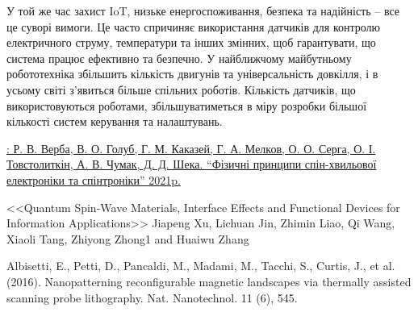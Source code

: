 \documentclass[a4paper,14pt]{extreport}
\begin{document}
У той же час захист IoT, низьке енергоспоживання, безпека та надійність – все це суворі вимоги. Це часто спричиняє використання датчиків для контролю електричного струму, температури та інших змінних, щоб гарантувати, що система працює ефективно та безпечно. У найближчому майбутньому робототехніка збільшить кількість двигунів та універсальність довкілля, і в усьому світі з'явиться більше спільних роботів. Кількість датчиків, що використовуються роботами, збільшуватиметься в міру розробки більшої кількості систем керування та налаштувань.

























\begin{thebibliography}{9}
 \href{http://www.kdpu-nt.gov.ua/sites/default/files/work_files/referat_signed.pdf}{: Р. В. Верба, В. О. Голуб, Г. М. Каказей, Г. А. Мелков,
О. О. Серга, О. І. Товстолиткін, А. В. Чумак, Д. Д. Шека. “Фізичні принципи спін-хвильової електроніки та спінтроніки” 2021p. }

 <<Quantum Spin-Wave Materials, Interface Effects and Functional Devices for Information Applications>>
Jiapeng Xu, Lichuan Jin, Zhimin Liao, Qi Wang, Xiaoli Tang, Zhiyong Zhong1 and Huaiwu Zhang

 Albisetti, E., Petti, D., Pancaldi, M., Madami, M., Tacchi, S., Curtis, J., et al. (2016).
Nanopatterning reconfigurable magnetic landscapes via thermally assisted scanning
probe lithography. Nat. Nanotechnol. 11 (6), 545.



 
\end{thebibliography}
\end{document}
